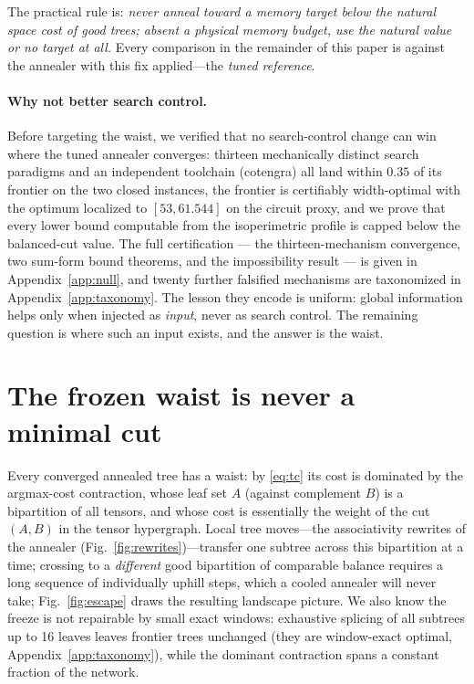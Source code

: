 \documentclass{SciPost}
\begin{document}
The practical rule is: \emph{never anneal toward a memory target below
the natural space cost of good trees; absent a physical memory budget,
use the natural value or no target at all.} Every comparison in the
remainder of this paper is against the annealer with this fix
applied---the \emph{tuned reference}.


\paragraph{Why not better search control.}
Before targeting the waist, we verified that no search-control change can
win where the tuned annealer converges: thirteen mechanically distinct
search paradigms and an independent toolchain (cotengra) all land within
$0.35$ of its frontier on the two closed instances, the frontier is
certifiably width-optimal with the optimum localized to $[53, 61.544]$
on the circuit proxy, and we prove that every lower bound computable
from the isoperimetric profile is capped below the balanced-cut value.
The full certification --- the thirteen-mechanism convergence, two
sum-form bound theorems, and the impossibility result --- is given in
Appendix~\ref{app:null}, and twenty further falsified mechanisms are
taxonomized in Appendix~\ref{app:taxonomy}. The lesson they encode is
uniform: global information helps only when injected as \emph{input},
never as search control. The remaining question is where such an input
exists, and the answer is the waist.

\section{The frozen waist is never a minimal cut}
\label{sec:frozenwaist}

Every converged annealed tree has a waist: by \eqref{eq:tc} its cost is
dominated by the argmax-cost contraction, whose leaf set $A$ (against
complement $B$) is a bipartition of all tensors, and whose cost is
essentially the weight of the cut $(A,B)$ in the tensor hypergraph.
Local tree moves---the associativity rewrites of the annealer
\cite{kalachev_2021_multi} (Fig.~\ref{fig:rewrites})---transfer one
subtree across this
bipartition at a time; crossing to a \emph{different} good
bipartition of comparable balance requires a long sequence of
individually uphill steps, which a cooled annealer will never take;
Fig.~\ref{fig:escape} draws the resulting landscape picture. We
also know the freeze is not repairable by small exact windows: exhaustive
splicing of all subtrees up to 16 leaves leaves frontier trees unchanged
(they are window-exact optimal, Appendix~\ref{app:taxonomy}), while the
dominant contraction spans a constant fraction of the network.
\end{document}

